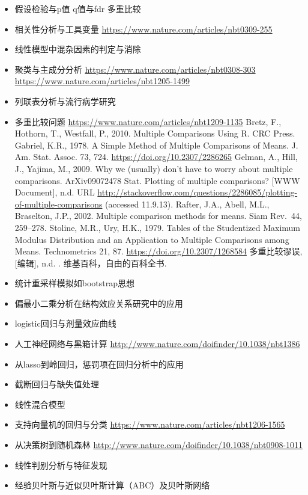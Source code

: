 \documentclass[]{book}
\begin{document}
\begin{itemize}
\item
  假设检验与p值 q值与fdr 多重比较
\item
  相关性分析与工具变量 \url{https://www.nature.com/articles/nbt0309-255}
\item
  线性模型中混杂因素的判定与消除
\item
  聚类与主成分分析 \url{https://www.nature.com/articles/nbt0308-303}
  \url{https://www.nature.com/articles/nbt1205-1499}
\item
  列联表分析与流行病学研究
\item
  多重比较问题 \url{https://www.nature.com/articles/nbt1209-1135} Bretz,
  F., Hothorn, T., Westfall, P., 2010. Multiple Comparisons Using R. CRC
  Press. Gabriel, K.R., 1978. A Simple Method of Multiple Comparisons of
  Means. J. Am. Stat. Assoc. 73, 724.
  \url{https://doi.org/10.2307/2286265} Gelman, A., Hill, J., Yajima,
  M., 2009. Why we (usually) don't have to worry about multiple
  comparisons. ArXiv09072478 Stat. Plotting of multiple comparisons?
  {[}WWW Document{]}, n.d. URL
  \url{http://stackoverflow.com/questions/2286085/plotting-of-multiple-comparisons}
  (accessed 11.9.13). Rafter, J.A., Abell, M.L., Braselton, J.P., 2002.
  Multiple comparison methods for means. Siam Rev.~44, 259--278.
  Stoline, M.R., Ury, H.K., 1979. Tables of the Studentized Maximum
  Modulus Distribution and an Application to Multiple Comparisons among
  Means. Technometrics 21, 87. \url{https://doi.org/10.2307/1268584}
  多重比较谬误, {[}编辑{]}, n.d. . 维基百科，自由的百科全书.
\item
  统计重采样模拟如bootstrap思想
\item
  偏最小二乘分析在结构效应关系研究中的应用
\item
  logistic回归与剂量效应曲线
\item
  人工神经网络与黑箱计算
  \url{http://www.nature.com/doifinder/10.1038/nbt1386}
\item
  从lasso到岭回归，惩罚项在回归分析中的应用
\item
  截断回归与缺失值处理
\item
  线性混合模型
\item
  支持向量机的回归与分类
  \url{https://www.nature.com/articles/nbt1206-1565}
\item
  从决策树到随机森林
  \url{http://www.nature.com/doifinder/10.1038/nbt0908-1011}
\item
  线性判别分析与特征发现
\item
  经验贝叶斯与近似贝叶斯计算（ABC）及贝叶斯网络

\end{itemize}
\end{document}
